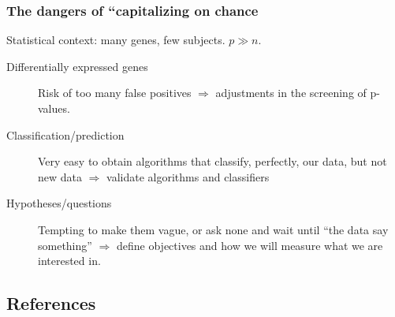 \begin{frame}
\frametitle{The dangers of ``capitalizing on chance}

Statistical context: many genes, few subjects. $p \gg n$.



\begin{description}
\item[Differentially expressed genes] Risk of too many false positives
  $\Rightarrow$ adjustments in the screening of p-values.
  
  
  \vspace*{20pt}
\item[Classification/prediction] Very easy to obtain algorithms that
  classify, perfectly, our data, but not new data
  $\Rightarrow$ validate algorithms and classifiers
  
  
  \vspace*{20pt}
\item[Hypotheses/questions] Tempting to make them vague, or ask none and
  wait until ``the data say something'' $\Rightarrow$ define objectives
  and how we will measure what we are interested in.
  
  
\end{description}
\end{frame}



\subsection{References}

